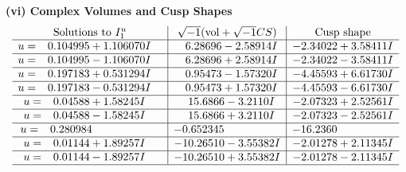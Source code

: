 \documentclass[1p]{elsarticle_modified}
\theoremstyle{definition}
\newcommand{\I}{\sqrt{-1}}
\begin{document}
\newpage\flushleft \textbf{(vi) Complex Volumes and Cusp Shapes}
$$\begin{array}{c|c|c}  
\text{Solutions to }I^u_{1}& \I (\text{vol} + \sqrt{-1}CS) & \text{Cusp shape}\\
 \hline 
\begin{aligned}
u &= \phantom{-}0.104995 + 1.106070 I\end{aligned}
 & \phantom{-}6.28696 - 2.58914 I & -2.34022 + 3.58411 I \\ \hline\begin{aligned}
u &= \phantom{-}0.104995 - 1.106070 I\end{aligned}
 & \phantom{-}6.28696 + 2.58914 I & -2.34022 - 3.58411 I \\ \hline\begin{aligned}
u &= \phantom{-}0.197183 + 0.531294 I\end{aligned}
 & \phantom{-}0.95473 - 1.57320 I & -4.45593 + 6.61730 I \\ \hline\begin{aligned}
u &= \phantom{-}0.197183 - 0.531294 I\end{aligned}
 & \phantom{-}0.95473 + 1.57320 I & -4.45593 - 6.61730 I \\ \hline\begin{aligned}
u &= \phantom{-}0.04588 + 1.58245 I\end{aligned}
 & \phantom{-}15.6866 - 3.2110 I & -2.07323 + 2.52561 I \\ \hline\begin{aligned}
u &= \phantom{-}0.04588 - 1.58245 I\end{aligned}
 & \phantom{-}15.6866 + 3.2110 I & -2.07323 - 2.52561 I \\ \hline\begin{aligned}
u &= \phantom{-}0.280984\phantom{ +0.000000I}\end{aligned}
 & -0.652345\phantom{ +0.000000I} & -16.2360\phantom{ +0.000000I} \\ \hline\begin{aligned}
u &= \phantom{-}0.01144 + 1.89257 I\end{aligned}
 & -10.26510 - 3.55382 I & -2.01278 + 2.11345 I \\ \hline\begin{aligned}
u &= \phantom{-}0.01144 - 1.89257 I\end{aligned}
 & -10.26510 + 3.55382 I & -2.01278 - 2.11345 I\\
 \hline 
 \end{array}$$\newpage
\newpage\renewcommand{\arraystretch}{1}
\end{document}
